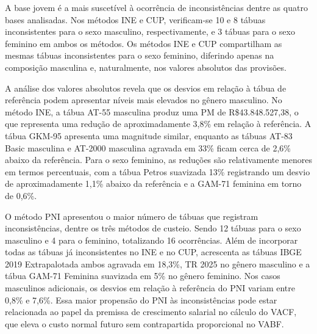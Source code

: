 \FloatBarrier
A base jovem é a mais suscetível à ocorrência de inconsistências dentre as quatro bases analisadas. Nos métodos INE e CUP, verificam-se 10 e 8 tábuas inconsistentes para o sexo masculino, respectivamente, e 3 tábuas para o sexo feminino em ambos os métodos. Os métodos INE e CUP compartilham as mesmas tábuas inconsistentes para o sexo feminino, diferindo apenas na composição masculina e, naturalmente, nos valores absolutos das provisões.

A análise dos valores absolutos revela que os desvios em relação à tábua de referência podem apresentar níveis mais elevados no gênero masculino. No método INE, a tábua AT-55 masculina produz uma PM de R\$43.848.527,38, o que representa uma redução de aproximadamente 3,8\% em relação à referência. A tábua GKM-95 apresenta uma magnitude similar, enquanto as tábuas AT-83 Basic masculina e AT-2000 masculina agravada em 33\% ficam cerca de 2,6\% abaixo da referência. Para o sexo feminino, as reduções são relativamente menores em termos percentuais, com a tábua Petros suavizada 13\% registrando um desvio de aproximadamente 1,1\% abaixo da referência e a GAM-71 feminina em torno de 0,6\%.

O método PNI apresentou o maior número de tábuas que registram inconsistências, dentre os três métodos de custeio. Sendo 12 tábuas para o sexo masculino e 4 para o feminino, totalizando 16 ocorrências. Além de incorporar todas as tábuas já inconsistentes no INE e no CUP, acrescenta as tábuas IBGE 2019 Extrapalotada ambos agravada em 18,3\%, TR 2025 no gênero masculino e a tábua GAM-71 Feminina suavizada em 5\% no gênero feminino. Nos casos masculinos adicionais, os desvios em relação à referência do PNI variam entre 0,8\% e 7,6\%. Essa maior propensão do PNI às inconsistências pode estar relacionada ao papel da premissa de crescimento salarial no cálculo do VACF, que eleva o custo normal futuro sem contrapartida proporcional no VABF.


